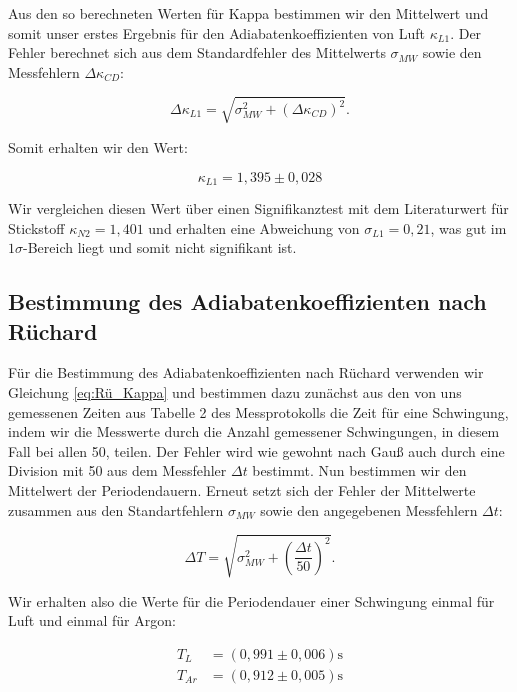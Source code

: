 \documentclass{article}
\begin{document}
\phantom{.}

Aus den so berechneten Werten für Kappa bestimmen wir den Mittelwert und somit unser erstes Ergebnis für den Adiabatenkoeffizienten von Luft $\kappa_{L1}$. Der Fehler berechnet sich aus dem Standardfehler des Mittelwerts $\sigma_{MW}$ sowie den Messfehlern $\Delta \kappa_{CD}$:

\begin{equation}
    \Delta \kappa_{L1} = \sqrt{\sigma_{MW}^2 + (\Delta \kappa_{CD})^2}.
\end{equation}

Somit erhalten wir den Wert:

\begin{equation}
    \kappa_{L1} = 1,395 \pm 0,028
\end{equation}

Wir vergleichen diesen Wert über einen Signifikanztest mit dem Literaturwert für Stickstoff $\kappa_{N2} = 1,401$ und erhalten eine Abweichung von $\sigma_{L1} = 0,21$, was gut im $1\sigma$-Bereich liegt und somit nicht signifikant ist. 

\subsection{Bestimmung des Adiabatenkoeffizienten nach Rüchard}

Für die Bestimmung des Adiabatenkoeffizienten nach Rüchard verwenden wir Gleichung \ref{eq:Rü_Kappa} und bestimmen dazu zunächst aus den von uns gemessenen Zeiten aus Tabelle 2 des Messprotokolls die Zeit für eine Schwingung, indem wir die Messwerte durch die Anzahl gemessener Schwingungen, in diesem Fall bei allen 50, teilen. Der Fehler wird wie gewohnt nach Gauß auch durch eine Division mit 50 aus dem Messfehler $\Delta t$ bestimmt. Nun bestimmen wir den Mittelwert der Periodendauern. Erneut setzt sich der Fehler der Mittelwerte zusammen aus den Standartfehlern $\sigma_{MW}$ sowie den angegebenen Messfehlern $\Delta t$:

\begin{equation}
    \Delta T = \sqrt{\sigma_{MW}^2 + \left( \frac{\Delta t}{50} \right)^2}.
\end{equation}

Wir erhalten also die Werte für die Periodendauer einer Schwingung einmal für Luft und einmal für Argon:

\begin{equation}
    \begin{split}
        T_L &= (0,991 \pm 0,006) \text{s} \\
        T_{Ar} &= (0,912 \pm 0,005) \text{s}
    \end{split}
\end{equation}
\end{document}

